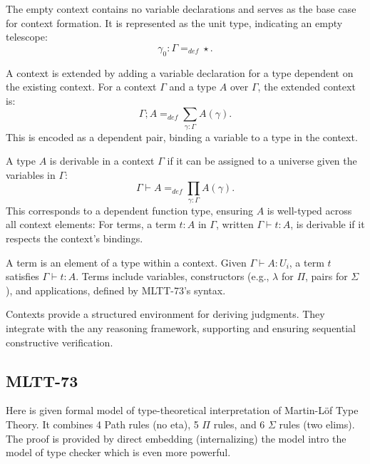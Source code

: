 \documentclass{article}
\begin{document}
\begin{definition}
The empty context contains no variable declarations and serves as the base case for context formation.
It is represented as the unit type, indicating an empty telescope:
\[
\gamma_0 : \Gamma =_{def} \star.
\]
\end{definition}

\begin{definition}
A context is extended by adding a variable declaration for a
type dependent on the existing context. For a context \( \Gamma \)
and a type \( A \) over \( \Gamma \), the extended context is:
\[
\Gamma ; A =_{def} \sum_{\gamma:\Gamma}A(\gamma).
\]
This is encoded as a dependent pair,
binding a variable to a type in the context.
\end{definition}

\begin{definition}
A type \( A \) is derivable in a context \( \Gamma \) if it can be
assigned to a universe given the variables in \( \Gamma \):
\[
\Gamma \vdash A =_{def} \prod_{\gamma:\Gamma}A(\gamma).
\]
This corresponds to a dependent function type,
ensuring \( A \) is well-typed across all context elements:
For terms, a term \( t : A \) in \( \Gamma \), written \( \Gamma \vdash t : A \),
is derivable if it respects the context’s bindings.
\end{definition}

\begin{definition}[Terms]
A term is an element of a type within a context.
Given \( \Gamma \vdash A : U_i \), a term \( t \)
satisfies \( \Gamma \vdash t : A \). Terms include
variables, constructors (e.g., \( \lambda \) for \( \Pi \),
pairs for \( \Sigma \)), and applications, defined by MLTT-73’s
syntax.
\end{definition}

Contexts provide a structured environment for deriving judgments.
They integrate with the any reasoning framework, supporting and ensuring
sequential constructive verification.

\subsection*{MLTT-73}
Here is given formal model of type-theoretical interpretation of Martin-Löf Type Theory.
It combines 4 Path rules (no eta), 5 $\Pi$ rules, and 6 $\Sigma$ rules (two elims).
The proof is provided by direct embedding (internalizing) the model intro the model
of type checker which is even more powerful.
\end{document}
